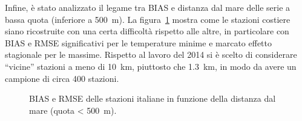 Infine, è stato analizzato il legame tra BIAS e distanza dal mare delle serie a bassa quota (inferiore a \qty{500}{\meter}). La figura~\ref{fig:sea-bias} mostra come le stazioni costiere siano ricostruite con una certa difficoltà rispetto alle altre, in particolare con BIAS e RMSE significativi per le temperature minime e marcato effetto stagionale per le massime. Rispetto al lavoro del 2014 si è scelto di considerare ``vicine'' stazioni a meno di \qty{10}{\kilo\meter}, piuttosto che \qty{1.3}{\kilo\meter}, in modo da avere un campione di circa 400 stazioni.

\begin{figure}[ht]
  \centering
  
  \caption{BIAS e RMSE delle stazioni italiane in funzione della distanza dal mare (quota < \qty{500}{\meter}).}\label{fig:sea-bias}
\end{figure}
